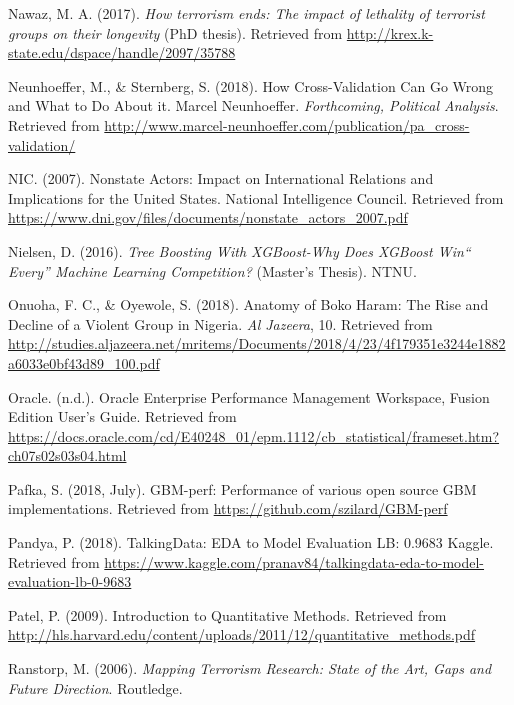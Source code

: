 \documentclass[11pt,oneside,a4paper]{reedthesis}
\begin{document}
\hypertarget{ref-Nawaz_2017}{}
Nawaz, M. A. (2017). \emph{How terrorism ends: The impact of lethality
of terrorist groups on their longevity} (PhD thesis). Retrieved from
\url{http://krex.k-state.edu/dspace/handle/2097/35788}

\hypertarget{ref-Neunhoeffer_2018}{}
Neunhoeffer, M., \& Sternberg, S. (2018). How Cross-Validation Can Go
Wrong and What to Do About it. \textbar{} Marcel Neunhoeffer.
\emph{Forthcoming, Political Analysis}. Retrieved from
\url{http://www.marcel-neunhoeffer.com/publication/pa_cross-validation/}

\hypertarget{ref-NIC_2007}{}
NIC. (2007). Nonstate Actors: Impact on International Relations and
Implications for the United States. National Intelligence Council.
Retrieved from
\url{https://www.dni.gov/files/documents/nonstate_actors_2007.pdf}

\hypertarget{ref-Nielsen_2016}{}
Nielsen, D. (2016). \emph{Tree Boosting With XGBoost-Why Does XGBoost
Win`` Every'' Machine Learning Competition?} (Master's Thesis). NTNU.

\hypertarget{ref-Onuoha_2018}{}
Onuoha, F. C., \& Oyewole, S. (2018). Anatomy of Boko Haram: The Rise
and Decline of a Violent Group in Nigeria. \emph{Al Jazeera}, 10.
Retrieved from
\url{http://studies.aljazeera.net/mritems/Documents/2018/4/23/4f179351e3244e1882a6033e0bf43d89_100.pdf}

\hypertarget{ref-Oracle_}{}
Oracle. (n.d.). Oracle Enterprise Performance Management Workspace,
Fusion Edition User's Guide. Retrieved from
\url{https://docs.oracle.com/cd/E40248_01/epm.1112/cb_statistical/frameset.htm?ch07s02s03s04.html}

\hypertarget{ref-Pafka_2018}{}
Pafka, S. (2018, July). GBM-perf: Performance of various open source GBM
implementations. Retrieved from
\url{https://github.com/szilard/GBM-perf}

\hypertarget{ref-Pandya_2018}{}
Pandya, P. (2018). TalkingData: EDA to Model Evaluation \textbar{} LB:
0.9683 \textbar{} Kaggle. Retrieved from
\url{https://www.kaggle.com/pranav84/talkingdata-eda-to-model-evaluation-lb-0-9683}

\hypertarget{ref-Patel_2009}{}
Patel, P. (2009). Introduction to Quantitative Methods. Retrieved from
\url{http://hls.harvard.edu/content/uploads/2011/12/quantitative_methods.pdf}

\hypertarget{ref-Ranstorp_2006}{}
Ranstorp, M. (2006). \emph{Mapping Terrorism Research: State of the Art,
Gaps and Future Direction}. Routledge.
\end{document}
